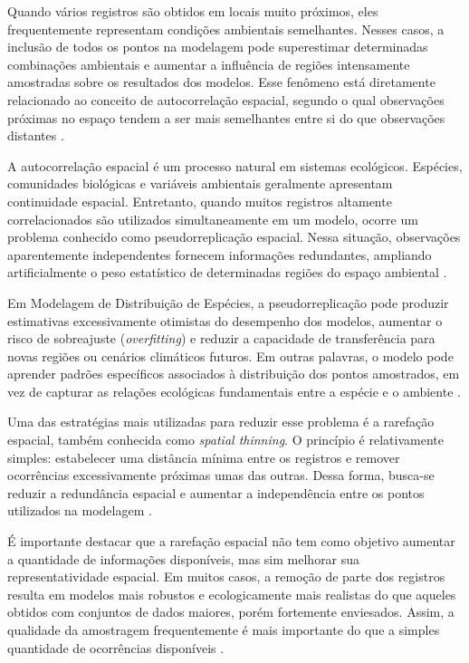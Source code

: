 Quando vários registros são obtidos em locais muito próximos, eles frequentemente representam condições ambientais semelhantes. Nesses casos, a inclusão de todos os pontos na modelagem pode superestimar determinadas combinações ambientais e aumentar a influência de regiões intensamente amostradas sobre os resultados dos modelos. Esse fenômeno está diretamente relacionado ao conceito de autocorrelação espacial, segundo o qual observações próximas no espaço tendem a ser mais semelhantes entre si do que observações distantes \parencite{legendre1993spatial}.

A autocorrelação espacial é um processo natural em sistemas ecológicos. Espécies, comunidades biológicas e variáveis ambientais geralmente apresentam continuidade espacial. Entretanto, quando muitos registros altamente correlacionados são utilizados simultaneamente em um modelo, ocorre um problema conhecido como pseudorreplicação espacial. Nessa situação, observações aparentemente independentes fornecem informações redundantes, ampliando artificialmente o peso estatístico de determinadas regiões do espaço ambiental \parencite{dormann2007methods}.

Em Modelagem de Distribuição de Espécies, a pseudorreplicação pode produzir estimativas excessivamente otimistas do desempenho dos modelos, aumentar o risco de sobreajuste (\textit{overfitting}) e reduzir a capacidade de transferência para novas regiões ou cenários climáticos futuros. Em outras palavras, o modelo pode aprender padrões específicos associados à distribuição dos pontos amostrados, em vez de capturar as relações ecológicas fundamentais entre a espécie e o ambiente \parencite{elith2009species,peterson2011ecological}.

Uma das estratégias mais utilizadas para reduzir esse problema é a rarefação espacial, também conhecida como \textit{spatial thinning}. O princípio é relativamente simples: estabelecer uma distância mínima entre os registros e remover ocorrências excessivamente próximas umas das outras. Dessa forma, busca-se reduzir a redundância espacial e aumentar a independência entre os pontos utilizados na modelagem \parencite{aiellolammens2015spthin}.

É importante destacar que a rarefação espacial não tem como objetivo aumentar a quantidade de informações disponíveis, mas sim melhorar sua representatividade espacial. Em muitos casos, a remoção de parte dos registros resulta em modelos mais robustos e ecologicamente mais realistas do que aqueles obtidos com conjuntos de dados maiores, porém fortemente enviesados. Assim, a qualidade da amostragem frequentemente é mais importante do que a simples quantidade de ocorrências disponíveis \parencite{boria2014spatial}.

